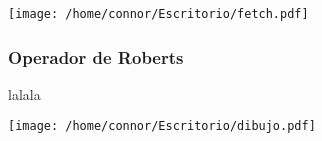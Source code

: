 \texttt{[image: /home/connor/Escritorio/fetch.pdf]}

\subsubsection{Operador de Roberts}



lalala 

\texttt{[image: /home/connor/Escritorio/dibujo.pdf]}

% 
% 
% 
% 





